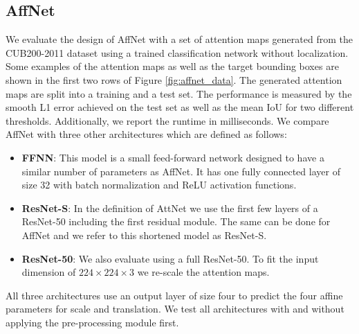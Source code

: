 \documentclass{bmvc2k}
\begin{document}
\subsection{AffNet}
We evaluate the design of AffNet with a set of attention maps generated from the CUB200-2011 dataset using a trained classification network without localization. Some examples of the attention maps as well as the target bounding boxes are shown in the first two rows of Figure \ref{fig:affnet_data}. The generated attention maps are split into a training and a test set.
The performance is measured by the smooth L1 error achieved on the test set as well as the mean IoU for two different thresholds. Additionally, we report the runtime in milliseconds.
We compare AffNet with three other architectures which are defined as follows:
\begin{itemize}
 \item \textbf{FFNN}: This model is a small feed-forward network designed to have a similar number of parameters as AffNet. It has one fully connected layer of size 32 with batch normalization and ReLU activation functions.
 \item \textbf{ResNet-S}: In the definition of AttNet we use the first few layers of a ResNet-50 including the first residual module. The same can be done for AffNet and we refer to this shortened model as ResNet-S.
 \item \textbf{ResNet-50}: We also evaluate using a full ResNet-50. To fit the input dimension of $224\times224\times3$ we re-scale the attention maps.
\end{itemize}

All three architectures use an output layer of size four to predict the four affine parameters for scale and translation. We test all architectures with and without applying the pre-processing module first.
\end{document}
